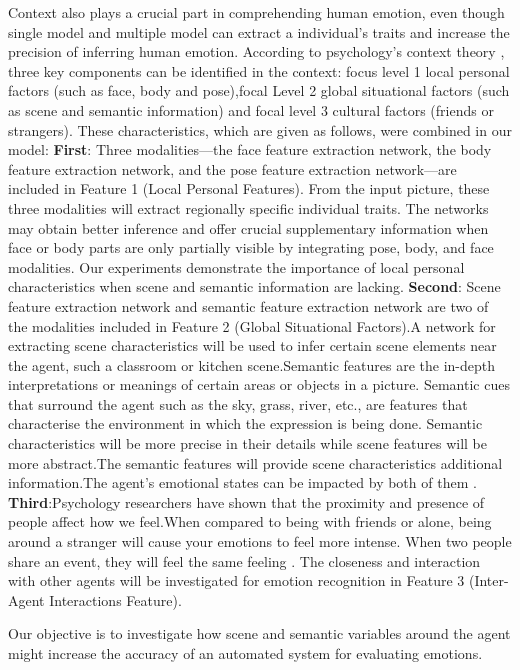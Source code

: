 \documentclass[conference]{IEEEtran}
\begin{document}
Context also plays a crucial part in comprehending human emotion, even though single model and multiple model can extract a individual's traits and increase the precision of inferring human emotion. According to psychology’s context theory \cite{ref-38}, three key components can be identified in the context: focus level 1 local personal factors (such as face, body and pose),focal Level 2 global situational factors (such as scene and semantic information) and focal level 3 cultural factors (friends or strangers). These characteristics, which are given as follows, were combined in our model: \textbf{First}: Three modalities—the face feature extraction network, the body feature extraction network, and the pose feature extraction network—are included in Feature 1 (Local Personal Features). From the input picture, these three modalities will extract regionally specific individual traits. The networks may obtain better inference and offer crucial supplementary information when face or body parts are only partially visible by integrating pose, body, and face modalities. Our experiments demonstrate the importance of local personal characteristics when scene and semantic information are lacking.
 \textbf{Second}: Scene feature extraction network and semantic feature extraction network are two of the modalities included in Feature 2 (Global Situational Factors).A network for extracting scene characteristics will be used to infer certain scene elements near the agent, such a classroom or kitchen scene.Semantic features are the in-depth interpretations or meanings of certain areas or objects in a picture. Semantic cues that surround the agent  such as the sky, grass, river, etc., are features that characterise the environment in which the expression is being done. Semantic characteristics will be more precise in their details while scene features will be more abstract.The semantic features will provide scene characteristics additional information.The agent's emotional states can be impacted by both of them \cite{ref-38}.
\textbf{Third}:Psychology researchers have shown that the proximity and presence of people affect how we feel.When compared to being with friends or alone, being around a stranger will cause your emotions to feel more intense\cite{ref-39}. When two people share an event, they will feel the same feeling \cite{ref-40}. The closeness and interaction with other agents will be investigated for emotion recognition in Feature 3 (Inter-Agent Interactions Feature).

Our objective is to investigate how scene and semantic variables around the agent might increase the accuracy of an automated system for evaluating emotions.
\end{document}
